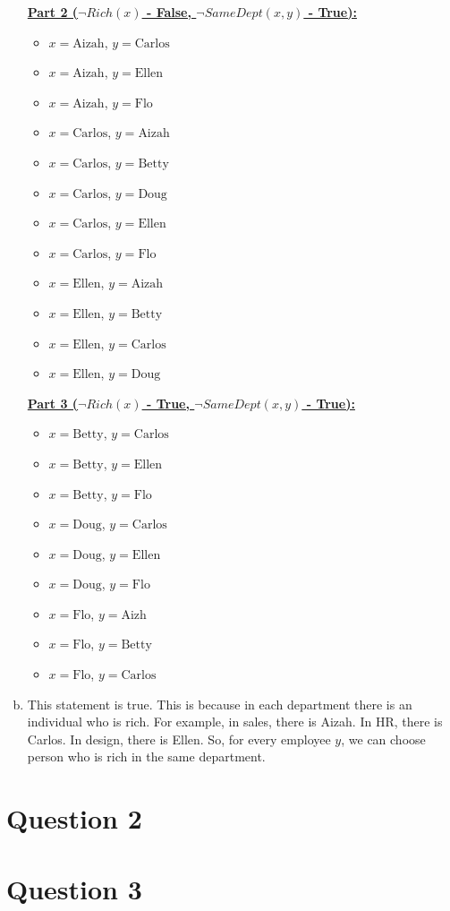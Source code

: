 \documentclass[12pt]{article}
\begin{document}
\begin{enumerate}[a.]
    \bigskip

    \underline{\textbf{Part 2 ($\neg Rich(x)$ - False, $\neg SameDept(x,y)$ - True):}}

    \begin{itemize}
        \item $x = \text{Aizah}$, $y = \text{Carlos}$
        \item $x = \text{Aizah}$, $y = \text{Ellen}$
        \item $x = \text{Aizah}$, $y = \text{Flo}$
        \item $x = \text{Carlos}$, $y = \text{Aizah}$
        \item $x = \text{Carlos}$, $y = \text{Betty}$
        \item $x = \text{Carlos}$, $y = \text{Doug}$
        \item $x = \text{Carlos}$, $y = \text{Ellen}$
        \item $x = \text{Carlos}$, $y = \text{Flo}$
        \item $x = \text{Ellen}$, $y = \text{Aizah}$
        \item $x = \text{Ellen}$, $y = \text{Betty}$
        \item $x = \text{Ellen}$, $y = \text{Carlos}$
        \item $x = \text{Ellen}$, $y = \text{Doug}$
    \end{itemize}

    \bigskip

    \underline{\textbf{Part 3 ($\neg Rich(x)$ - True, $\neg SameDept(x,y)$ - True):}}

    \begin{itemize}
        \item $x = \text{Betty}$, $y = \text{Carlos}$
        \item $x = \text{Betty}$, $y = \text{Ellen}$
        \item $x = \text{Betty}$, $y = \text{Flo}$
        \item $x = \text{Doug}$, $y = \text{Carlos}$
        \item $x = \text{Doug}$, $y = \text{Ellen}$
        \item $x = \text{Doug}$, $y = \text{Flo}$
        \item $x = \text{Flo}$, $y = \text{Aizh}$
        \item $x = \text{Flo}$, $y = \text{Betty}$
        \item $x = \text{Flo}$, $y = \text{Carlos}$
    \end{itemize}

    \item

    This statement is true. This is because in each department there is an
    individual who is rich. For example, in sales, there is Aizah. In HR, there
    is Carlos. In design, there is Ellen. So, for every employee $y$, we can choose
    person who is rich in the same department.

\end{enumerate}

\newpage

\section*{Question 2}

\section*{Question 3}
\end{document}
